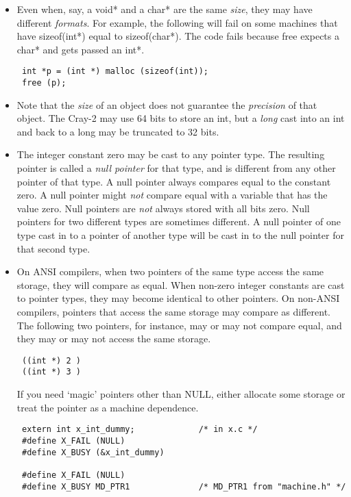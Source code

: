 \begin{itemize}
\item Even when, say, a void* and a char* are the same {\em size}, they may
have different {\em formats}.  For example, the following will fail on some
machines that have sizeof(int*) equal to  sizeof(char*). The code fails
because free expects a char* and gets passed an int*. 
\begin{verbatim}
 int *p = (int *) malloc (sizeof(int));
 free (p);
\end{verbatim}

\item Note that the {\em size} of an object does not guarantee the
{\em precision} of that object. The Cray-2 may use 64 bits to store an int,
but a {\em long} cast into an
int and back to a long may be truncated to 32 bits. 

\item The integer constant zero may be cast to any pointer type. The resulting
pointer is called a {\em null pointer} for that type, and is different from any
other pointer of that type. A null pointer always compares equal to the
constant zero. A null pointer might {\em not} compare equal with a variable
that has the value zero. Null pointers are {\em not} always stored with all
bits zero. Null pointers for two different types are sometimes different. A
null pointer of one type cast in to a pointer of another type will be cast in
to the null pointer for that second type. 

\item On ANSI compilers, when two pointers of the same type access the same
storage, they will compare as equal. When non-zero integer constants are cast
to pointer types, they may become identical to other pointers. On non-ANSI
compilers, pointers that access the same storage may compare as different. The
following two pointers, for instance, may or may not compare equal, and they
may or may not access the same storage.
\begin{verbatim}
 ((int *) 2 )
 ((int *) 3 ) 
\end{verbatim}

If you need `magic' pointers other than NULL, either allocate some storage or
treat the pointer as a machine dependence. 

\begin{verbatim}
 extern int x_int_dummy;             /* in x.c */
 #define X_FAIL (NULL)
 #define X_BUSY (&x_int_dummy)

 #define X_FAIL (NULL)
 #define X_BUSY MD_PTR1              /* MD_PTR1 from "machine.h" */ 
\end{verbatim}


\end{itemize}
